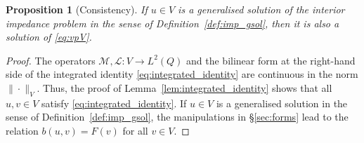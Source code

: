\documentclass[a4paper]{article}
\theoremstyle{plain}
\newtheorem{proposition}[theorem]{Proposition}
\theoremstyle{definition}
\newcommand{\operator}[1]{\mathcal{#1}}
\begin{document}
\begin{proposition}[Consistency]\label{prop:EquivLadyzVP}
	If $u \in V$ is a generalised solution of the interior impedance problem in the sense of Definition~\ref{def:imp_gsol}, then it is also a solution of \eqref{eq:vpV}.
\end{proposition}
\begin{proof}
	The operators $\operator{M,L}:V\to L^2(Q)$ and the bilinear form at the right-hand side of the integrated identity \eqref{eq:integrated_identity} are continuous in the norm $\|\cdot\|_V$. Thus, the proof of Lemma~\ref{lem:integrated_identity} shows that all
	$u,v\in V$ satisfy \eqref{eq:integrated_identity}.
	If $u\in V$ is a generalised solution in the sense of Definition~\ref{def:imp_gsol}, the manipulations in \S\ref{sec:forms} lead to the relation $b(u,v)=F(v)$ for all $v\in V$.
\end{proof}
\end{document}
